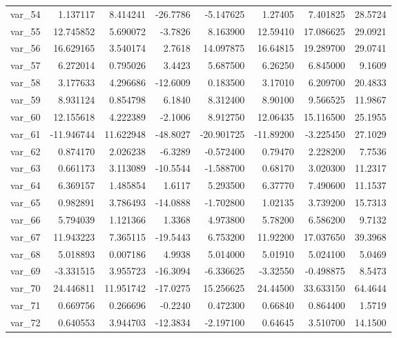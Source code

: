 \documentclass[12pt]{article}
\begin{document}
\begin{longtable}{lrrrrrrr}
  var\_54 &   1.137117 &   8.414241 & -26.7786 &  -5.147625 &   1.27405 &   7.401825 &  28.5724 \\
  var\_55 &  12.745852 &   5.690072 &  -3.7826 &   8.163900 &  12.59410 &  17.086625 &  29.0921 \\
  var\_56 &  16.629165 &   3.540174 &   2.7618 &  14.097875 &  16.64815 &  19.289700 &  29.0741 \\
  var\_57 &   6.272014 &   0.795026 &   3.4423 &   5.687500 &   6.26250 &   6.845000 &   9.1609 \\
  var\_58 &   3.177633 &   4.296686 & -12.6009 &   0.183500 &   3.17010 &   6.209700 &  20.4833 \\
  var\_59 &   8.931124 &   0.854798 &   6.1840 &   8.312400 &   8.90100 &   9.566525 &  11.9867 \\
  var\_60 &  12.155618 &   4.222389 &  -2.1006 &   8.912750 &  12.06435 &  15.116500 &  25.1955 \\
  var\_61 & -11.946744 &  11.622948 & -48.8027 & -20.901725 & -11.89200 &  -3.225450 &  27.1029 \\
  var\_62 &   0.874170 &   2.026238 &  -6.3289 &  -0.572400 &   0.79470 &   2.228200 &   7.7536 \\
  var\_63 &   0.661173 &   3.113089 & -10.5544 &  -1.588700 &   0.68170 &   3.020300 &  11.2317 \\
  var\_64 &   6.369157 &   1.485854 &   1.6117 &   5.293500 &   6.37770 &   7.490600 &  11.1537 \\
  var\_65 &   0.982891 &   3.786493 & -14.0888 &  -1.702800 &   1.02135 &   3.739200 &  15.7313 \\
  var\_66 &   5.794039 &   1.121366 &   1.3368 &   4.973800 &   5.78200 &   6.586200 &   9.7132 \\
  var\_67 &  11.943223 &   7.365115 & -19.5443 &   6.753200 &  11.92200 &  17.037650 &  39.3968 \\
  var\_68 &   5.018893 &   0.007186 &   4.9938 &   5.014000 &   5.01910 &   5.024100 &   5.0469 \\
  var\_69 &  -3.331515 &   3.955723 & -16.3094 &  -6.336625 &  -3.32550 &  -0.498875 &   8.5473 \\
  var\_70 &  24.446811 &  11.951742 & -17.0275 &  15.256625 &  24.44500 &  33.633150 &  64.4644 \\
  var\_71 &   0.669756 &   0.266696 &  -0.2240 &   0.472300 &   0.66840 &   0.864400 &   1.5719 \\
  var\_72 &   0.640553 &   3.944703 & -12.3834 &  -2.197100 &   0.64645 &   3.510700 &  14.1500 \\

\end{longtable}
\end{document}
